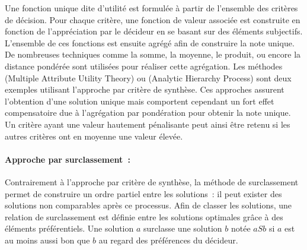 Une fonction unique dite d’utilité est formulée à partir de l’ensemble des critères
de décision. Pour chaque critère, une fonction de valeur associée est construite en
fonction de l’appréciation par le décideur en se basant sur des éléments subjectifs.
L’ensemble de ces fonctions est ensuite agrégé afin de construire la note unique.
De nombreuses techniques comme la somme, la moyenne, le produit, ou encore la distance
pondérée sont utilisées pour réaliser cette agrégation.
Les méthodes  (Multiple Attribute Utility Theory) \parencite{Fishburn1970}
ou  (Analytic Hierarchy Process) \parencite{Saaty1987161} sont deux exemples utilisant
l’approche par critère de synthèse.
Ces approches assurent l’obtention d’une solution unique mais comportent
cependant un fort effet compensatoire due à l’agrégation par pondération pour
obtenir la note unique. Un critère ayant une valeur hautement pénalisante peut
ainsi être retenu si les autres critères ont en moyenne une valeur élevée.

\paragraph{Approche par surclassement~:} %
\label{par:approche_par_surclassement}
Contrairement à l’approche par critère de synthèse, la méthode de surclassement
permet de construire un ordre partiel entre les solutions~: il peut exister
des solutions non comparables après ce processus.
Afin de classer les solutions, une relation de surclassement est définie entre les
solutions optimales grâce à des éléments préférentiels.
Une solution $a$ surclasse une solution $b$ notée $aSb$ si $a$ est au moins aussi
bon que $b$ au regard des préférences du décideur.

